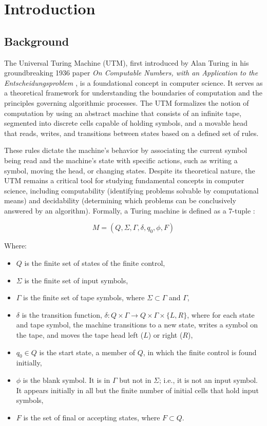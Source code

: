 \chapter{Introduction}

\section{Background}
The Universal Turing Machine (UTM), first introduced by Alan Turing in his groundbreaking 1936 paper \textit{On Computable Numbers, with an Application to the Entscheidungsproblem \cite{turing1936}}, is a foundational concept in computer science. It serves as a theoretical framework for understanding the boundaries of computation and the principles governing algorithmic processes. The UTM formalizes the notion of computation by using an abstract machine that consists of an infinite tape, segmented into discrete cells capable of holding symbols, and a movable head that reads, writes, and transitions between states based on a defined set of rules.

These rules dictate the machine's behavior by associating the current symbol being read and the machine's state with specific actions, such as writing a symbol, moving the head, or changing states. Despite its theoretical nature, the UTM remains a critical tool for studying fundamental concepts in computer science, including computability (identifying problems solvable by computational means) and decidability (determining which problems can be conclusively answered by an algorithm). Formally, a Turing machine is defined as a 7-tuple \cite{automataHopcroft}:

\[
M = (Q, \Sigma, \Gamma, \delta, q_0, \phi, F)
\]

Where:
\begin{itemize}
    \item \( Q \) is the finite set of states of the finite control,
    \item \( \Sigma \) is the finite set of input symbols,
    \item \( \Gamma \) is the finite set of tape symbols, where \( \Sigma \subset \Gamma \) and \( \Gamma \),
    \item \( \delta \) is the transition function, \( \delta: Q \times \Gamma \to Q \times \Gamma \times \{L, R\} \), where for each state and tape symbol, the machine transitions to a new state, writes a symbol on the tape, and moves the tape head left (\( L \)) or right (\( R \)),
    \item \( q_0 \in Q \) is the start state, a member of \( Q \), in which the finite control is found initially,
    \item \( \phi \) is the blank symbol. It is in \( \Gamma \) but not in \( \Sigma \); i.e., it is not an input symbol. It appears initially in all but the finite number of initial cells that hold input symbols,
    \item \( F \) is the set of final or accepting states, where \(F \subset Q\).
\end{itemize}

